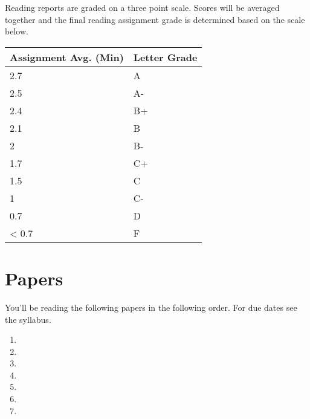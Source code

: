 \documentclass[10pt]{article}
\begin{document}
Reading reports are graded on a three point scale. Scores will be averaged together and
the final reading assignment grade is determined based on the scale below.

\begin{center}
\begin{small}
\begin{tabular}{ll}
Assignment Avg. (Min) & Letter Grade \\ \toprule
2.7   & A  \\
2.5    & A- \\
2.4 & B+ \\
2.1    & B  \\
2   & B- \\
1.7    & C+ \\
1.5 & C  \\
1   & C- \\
0.7    & D  \\
< 0.7  & F
\end{tabular}
\end{small}
\end{center}

\section{Papers}

You'll be reading the following papers in the following order. For due dates see the syllabus. 

\begin{enumerate}
  \item {}
  \item {}
  \item {}
  \item {}
  \item {}
  \item {}
  \item {}
\end{enumerate}



\end{document}
